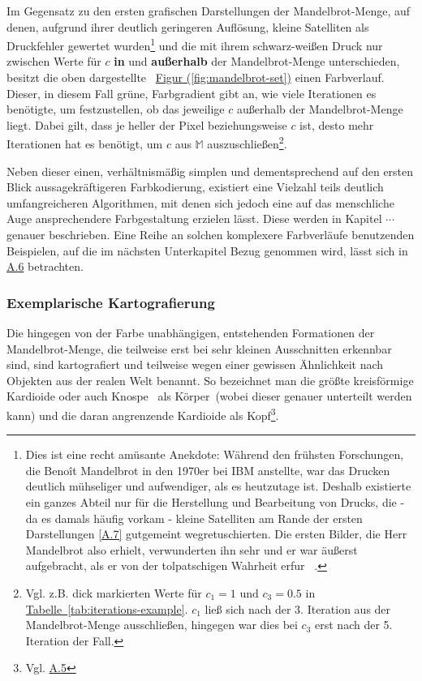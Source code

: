 Im Gegensatz zu den ersten grafischen Darstellungen der Mandelbrot-Menge,
auf denen, aufgrund ihrer deutlich geringeren Auflösung,
kleine Satelliten als Druckfehler gewertet wurden\footnote{
  Dies ist eine recht amüsante Anekdote: Während den frühsten Forschungen,
  die Benoît Mandelbrot in den 1970er bei IBM anstellte, war das Drucken deutlich
  mühseliger und aufwendiger, als es heutzutage ist.
  Deshalb existierte ein ganzes Abteil nur für die Herstellung und Bearbeitung von
  Drucks, die - da es damals häufig vorkam - kleine Satelliten am Rande der ersten
  Darstellungen \hyperref[app:7]{[A.7]} gutgemeint wegretuschierten.
  Die ersten Bilder, die Herr Mandelbrot also erhielt, verwunderten ihn sehr und
  er war äußerst aufgebracht, als er von der tolpatschigen Wahrheit erfur
  ~\cite{numberphile_whats_nodate}.
}
und die mit ihrem schwarz-weißen Druck nur zwischen Werte für $c$ \textbf{in}
und \textbf{außerhalb} der Mandelbrot-Menge unterschieden,
besitzt die oben dargestellte
~\hyperref[fig:mandelbrot-set]{Figur (\ref{fig:mandelbrot-set})}
einen Farbverlauf.
Dieser, in diesem Fall grüne, Farbgradient gibt an, wie viele Iterationen es benötigte,
um festzustellen, ob das jeweilige $c$ außerhalb der Mandelbrot-Menge liegt.
Dabei gilt, dass je heller der Pixel beziehungsweise $c$ ist, desto mehr
Iterationen hat es benötigt, um $c$ aus $\mathbb{M}$ auszuschließen\footnote{
  Vgl. z.B. dick markierten Werte für $c_1 = 1 \text{ und } c_3 = 0.5$ in
  \hyperref[tab:iterations-example]{Tabelle~\ref{tab:iterations-example}}.
  $c_1$ ließ sich nach der 3. Iteration aus der Mandelbrot-Menge ausschließen,
  hingegen war dies bei $c_3$ erst nach der 5. Iteration der Fall.
}.

Neben dieser einen, verhältnismäßig simplen und dementsprechend auf den ersten
Blick aussagekräftigeren Farbkodierung, existiert eine Vielzahl teils deutlich
umfangreicheren Algorithmen, mit denen sich jedoch eine auf das menschliche Auge
ansprechendere Farbgestaltung erzielen lässt.
Diese werden in Kapitel $\cdots$ %
genauer beschrieben.
Eine Reihe an solchen komplexere Farbverläufe benutzenden Beispielen,
auf die im nächsten Unterkapitel Bezug genommen wird,
lässt sich in \hyperref[app:6]{A.6} betrachten.

\subsubsection{Exemplarische Kartografierung}

Die hingegen von der Farbe unabhängigen, entstehenden Formationen der
Mandelbrot-Menge, die teilweise erst bei sehr kleinen Ausschnitten erkennbar sind,
sind kartografiert und teilweise wegen einer gewissen Ähnlichkeit nach
Objekten aus der realen Welt benannt.
So bezeichnet man die größte kreisförmige Kardioide oder auch \glqq Knospe\grqq
~als \glqq K\"orper\grqq~(wobei dieser genauer unterteilt werden kann)
und die daran angrenzende Kardioide als
\glqq Kopf\grqq\footnote{Vgl. \hyperref[app:5]{A.5}}.


